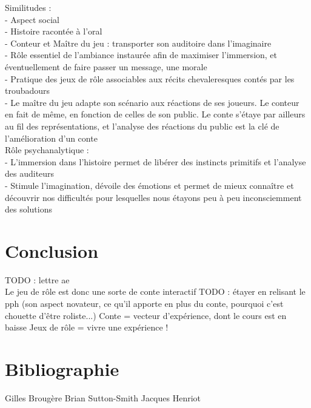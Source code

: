 \documentclass[a4paper,12pt,final,oneside]{article}
\begin{document}
Similitudes :\\
- Aspect social\\
- Histoire racontée à l'oral\\
- Conteur et Maître du jeu : transporter son auditoire dans l'imaginaire\\
- Rôle essentiel de l'ambiance instaurée afin de maximiser l'immersion, et éventuellement de faire passer un message, une morale\\
- Pratique des jeux de rôle associables aux récits chevaleresques contés par les troubadours\\
- Le maître du jeu adapte son scénario aux réactions de ses joueurs. Le conteur en fait de même, en fonction de celles de son public. Le conte s'étaye par ailleurs au fil des représentations, et l'analyse des réactions du public est la clé de l'amélioration d'un conte\\

Rôle psychanalytique :\\
- L'immersion dans l'histoire permet de libérer des instincts primitifs et l'analyse des auditeurs\\
- Stimule l'imagination, dévoile des émotions et permet de mieux connaître et découvrir nos difficultés pour lesquelles nous étayons peu à peu inconsciemment des solutions\\

\clearpage



\section{Conclusion}
TODO : lettre ae\\
Le jeu de rôle est donc une sorte de conte interactif
TODO : étayer en relisant le pph (son aspect novateur, ce qu'il apporte en plus du conte, pourquoi c'est chouette d'être roliste...)
Conte = vecteur d'expérience, dont le cours est en baisse
Jeux de rôle = vivre une expérience !
\clearpage

\section{Bibliographie}
\def\section*#1{} %


Gilles Brougère
Brian Sutton-Smith
Jacques Henriot
\end{document}

